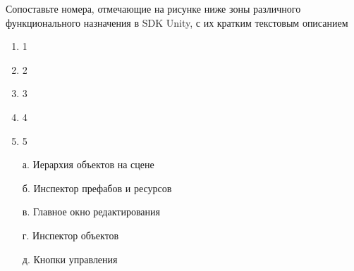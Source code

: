 

Сопоставьте номера, отмечающие на рисунке ниже зоны различного функционального назначения в SDK Unity, с их кратким текстовым описанием

\begin{multicols}{2}
    {
        \begin{enumerate}
            \item 1
            \item 2
            \item 3
            \item 4
            \item 5
        \end{enumerate}
    }    
    {
        \begin{enumerate}
            \item[а.] Иерархия объектов на сцене
            \item[б.] Инспектор префабов и ресурсов
            \item[в.] Главное окно редактирования
            \item[г.] Инспектор объектов
            \item[д.] Кнопки управления 
        \end{enumerate}
    }
\end{multicols}

